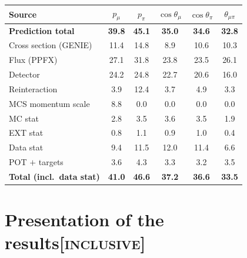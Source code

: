 \documentclass[11pt,a4paper]{article}
\newcommand{\scopetag}[1]{\hfill{\normalfont\small\textsc{[#1]}}}
\begin{document}
\begin{center}\scriptsize
{}
\label{tab:systbreak_comb}
\begin{tabular}{lccccc}
\toprule
Source & $p_\mu$ & $p_\pi$ & $\cos\theta_\mu$ & $\cos\theta_\pi$ & $\theta_{\mu\pi}$ \\
\midrule
\textbf{Prediction total} & \textbf{39.8} & \textbf{45.1} & \textbf{35.0} & \textbf{34.6} & \textbf{32.8} \\
Cross section (GENIE) & 11.4 & 14.8 & 8.9 & 10.6 & 10.3 \\
Flux (PPFX) & 27.1 & 31.8 & 23.8 & 23.5 & 26.1 \\
Detector & 24.2 & 24.8 & 22.7 & 20.6 & 16.0 \\
Reinteraction & 3.9 & 12.4 & 3.7 & 4.9 & 3.3 \\
MCS momentum scale & 8.8 & 0.0 & 0.0 & 0.0 & 0.0 \\
MC stat & 2.8 & 3.5 & 3.6 & 3.5 & 1.9 \\
EXT stat & 0.8 & 1.1 & 0.9 & 1.0 & 0.4 \\
Data stat & 9.4 & 11.5 & 12.0 & 11.4 & 6.6 \\
POT $+$ targets & 3.6 & 4.3 & 3.3 & 3.2 & 3.5 \\
\textbf{Total (incl.\ data stat)} & \textbf{41.0} & \textbf{46.6} & \textbf{37.2} & \textbf{36.6} & \textbf{33.5} \\
\bottomrule
\end{tabular}
\end{center}



\section[Presentation of the results]{Presentation of the results\scopetag{inclusive}}
\label{sec:supp_caveats}
\end{document}
